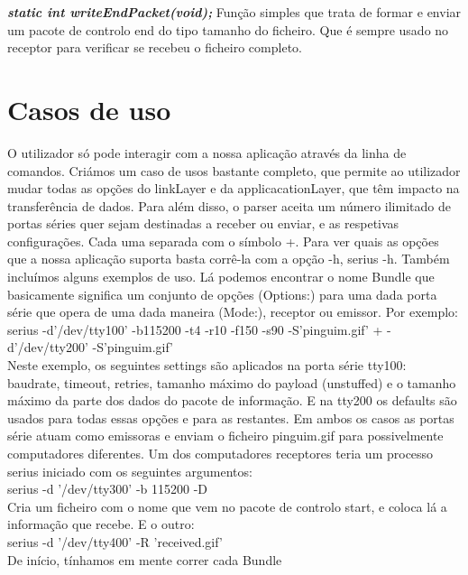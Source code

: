 \documentclass[a4paper]{article}
\begin{document}
\noindent\textbf{\textit{static int writeEndPacket(void);}}
Função simples que trata de formar e enviar um pacote de controlo end do tipo
tamanho do ficheiro. Que é sempre usado no receptor para verificar se recebeu o
ficheiro completo.

\section{Casos de uso}
O utilizador só pode interagir com a nossa aplicação através da linha de
comandos. Criámos um caso de usos bastante completo, que permite ao utilizador
mudar todas as opções do linkLayer e da applicacationLayer, que têm impacto na
transferência de dados. Para além disso, o parser aceita um número ilimitado de
portas séries quer sejam destinadas a receber ou enviar, e as respetivas
configurações. Cada uma separada com o símbolo +. Para ver quais as opções que
a nossa aplicação suporta basta corrê-la com a opção -h, serius -h. Também
incluímos alguns exemplos de uso. Lá podemos encontrar o nome Bundle que
basicamente significa um conjunto de opções (Options:) para uma dada porta
série que opera de uma dada maneira (Mode:), receptor ou emissor. Por
exemplo:\\\newline serius -d'/dev/tty100' -b115200 -t4 -r10 -f150 -s90
-S'pinguim.gif' + -d'/dev/tty200' -S'pinguim.gif'\\\newline Neste exemplo, os
seguintes settings são aplicados na porta série tty100: baudrate, timeout,
retries, tamanho máximo do payload (unstuffed) e o tamanho máximo da parte dos
dados do pacote de informação. E na tty200 os defaults são usados para todas
essas opções e para as restantes. Em ambos os casos as portas série atuam como
emissoras e enviam o ficheiro pinguim.gif para possivelmente computadores
diferentes. Um dos computadores receptores teria um processo serius iniciado
com os seguintes argumentos:\\\newline serius -d '/dev/tty300' -b 115200 -D\\
Cria um ficheiro com o nome que vem no pacote de controlo start, e coloca lá a
informação que recebe. E o outro:\\\newline serius -d '/dev/tty400'
-R 'received.gif' \\\newline De início, tínhamos em mente correr cada Bundle
\end{document}
